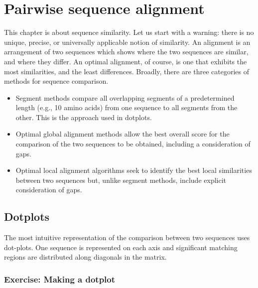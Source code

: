 \documentclass[12pt]{report}
\begin{document}
\chapter{Pairwise sequence alignment}

This chapter is	about sequence similarity.  Let	us start with a
warning: there is no unique, precise, or universally applicable	notion
of similarity. An alignment is an arrangement of two sequences which
shows where the	two sequences are similar, and where they differ.  An
optimal	alignment, of course, is one that exhibits the most
similarities, and the least differences. Broadly, there	are three
categories of methods for sequence comparison.

\begin{itemize}
\item Segment methods compare all overlapping segments of a predetermined
length (e.g., 10 amino acids) from one sequence	to all segments	from
the other. This	is the approach	used in	dotplots.
\item Optimal global alignment methods allow the best overall score for	the comparison of
the two	sequences to be	obtained, including a consideration of gaps.
\item Optimal local alignment algorithms seek to identify the best local
similarities between two sequences but,
unlike segment methods,	include	explicit consideration of gaps.
\end{itemize}

\section{Dotplots}
The most intuitive representation of the comparison between two
sequences uses dot-plots. One sequence is represented on each axis
and significant	matching regions are distributed along diagonals
in the matrix.

\subsection*{Exercise: Making a	dotplot}

\unix{}\\
\\
\\
\\
\\
\\
\end{document}
